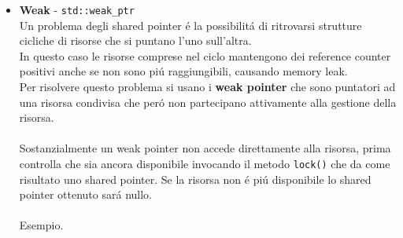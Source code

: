\documentclass{article}
\newcommand\tab[1][1cm]{\hspace*{#1}}
\begin{document}
\begin{itemize}
\texttt{void foo() \{ \\ \\ \tab std::shared\_pointer<int> pi; \{ \\ \\ \tab \tab \textcolor{grigio}{// RC = Reference Counter.}\\ \tab \tab std::shared\_ptr<int> pj(new int(42)); \textcolor{grigio}{// RC=1.} \\ \tab \tab pi = pj; \textcolor{grigio}{// Condivisione risorsa, RC=2.} \\ \tab \tab ++(*pi); \textcolor{grigio}{// Uso risorsa condivisa, valore = 43.} \\ \tab \tab ++(*pj); \textcolor{grigio}{// Uso risorsa condivisa, valore = 44.} \\ \tab \} \textcolor{grigio}{// Distruzione di pj, RC=1.} \\ \\ \tab ++(*pi); \textcolor{grigio}{// Uso risorsa, valore = 45.} \\ \} \textcolor{grigio}{// Distruzione di pi, RC=0 e rilascio risorsa.} }
\\
\item \textcolor{blu}{\textbf{Weak} - \texttt{std::weak\_ptr}} \\
Un problema degli shared pointer \'e la possibilit\'a di ritrovarsi strutture cicliche di risorse che si puntano l'uno sull'altra. \\In questo caso le risorse comprese nel ciclo mantengono dei reference counter positivi anche se non sono pi\'u raggiungibili, causando memory leak. \\ Per risolvere questo problema si usano i \textbf{weak pointer} che sono puntatori ad una risorsa condivisa che per\'o non partecipano attivamente alla gestione della risorsa. \\
\\ Sostanzialmente un weak pointer non accede direttamente alla risorsa, prima controlla che sia ancora disponibile invocando il metodo \texttt{lock()} che da come risultato uno shared pointer. Se la risorsa non \'e pi\'u disponibile lo shared pointer ottenuto sar\'a nullo. \\ \\ Esempio. \\ \\

\end{itemize}
\end{document}
